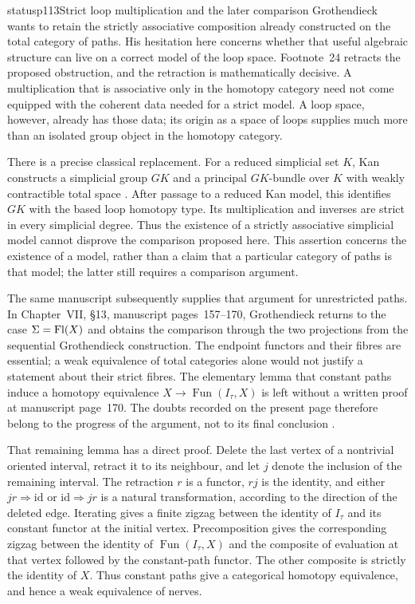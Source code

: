\begin{dcomment}{status}{p113}{Strict loop multiplication and the later comparison}
Grothendieck wants to retain the strictly associative composition already constructed on the total category of paths.  His hesitation here concerns whether that useful algebraic structure can live on a correct model of the loop space.  Footnote~24 retracts the proposed obstruction, and the retraction is mathematically decisive.  A multiplication that is associative only in the homotopy category need not come equipped with the coherent data needed for a strict model.  A loop space, however, already has those data; its origin as a space of loops supplies much more than an isolated group object in the homotopy category.

There is a precise classical replacement.  For a reduced simplicial set $K$, Kan constructs a simplicial group $GK$ and a principal $GK$-bundle over $K$ with weakly contractible total space \citep[Definition~6.3 and Theorem~7.1]{Kan1958Combinatorial}.  After passage to a reduced Kan model, this identifies $GK$ with the based loop homotopy type.  Its multiplication and inverses are strict in every simplicial degree.  Thus the existence of a strictly associative simplicial model cannot disprove the comparison proposed here.  This assertion concerns the existence of a model, rather than a claim that a particular category of paths is that model; the latter still requires a comparison argument.

The same manuscript subsequently supplies that argument for unrestricted paths.  In Chapter~VII, \S13, manuscript pages~157--170, Grothendieck returns to the case $\Sigma=\mathrm{Fl}(X)$ and obtains the comparison through the two projections from the sequential Grothendieck construction.  The endpoint functors and their fibres are essential; a weak equivalence of total categories alone would not justify a statement about their strict fibres.  The elementary lemma that constant paths induce a homotopy equivalence $X\to\operatorname{Fun}(I_\tau,X)$ is left without a written proof at manuscript page~170.  The doubts recorded on the present page therefore belong to the progress of the argument, not to its final conclusion \citep[Ch.~VII, \S13]{GrothendieckDerivateursVII}.

That remaining lemma has a direct proof.  Delete the last vertex of a nontrivial oriented interval, retract it to its neighbour, and let $j$ denote the inclusion of the remaining interval.  The retraction $r$ is a functor, $rj$ is the identity, and either $jr\Rightarrow\mathrm{id}$ or $\mathrm{id}\Rightarrow jr$ is a natural transformation, according to the direction of the deleted edge.  Iterating gives a finite zigzag between the identity of $I_\tau$ and its constant functor at the initial vertex.  Precomposition gives the corresponding zigzag between the identity of $\operatorname{Fun}(I_\tau,X)$ and the composite of evaluation at that vertex followed by the constant-path functor.  The other composite is strictly the identity of $X$.  Thus constant paths give a categorical homotopy equivalence, and hence a weak equivalence of nerves.


\end{dcomment}
